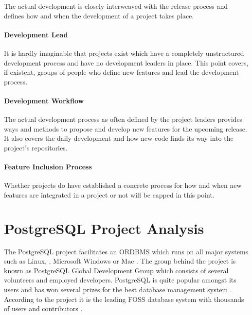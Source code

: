 The actual development is closely interweaved with the release process and
defines how and when the development of a project takes place.

\paragraph{Development Lead}

It is hardly imaginable that projects exist which have a completely
unstructured development process and have no development leaders in place. This
point covers, if existent, groups of people who define new features and lead
the development process.

\paragraph{Development Workflow}

The actual development process as often defined by the project leaders provides
ways and methods to propose and develop new features for the upcoming release.
It also covers the daily development and how new code finds its way into the
project's repositories.

\paragraph{Feature Inclusion Process}

Whether projects do have established a concrete process for how and when new
features are integrated in a project or not will be capped in this point.


\cleardoublepage

\section{PostgreSQL Project Analysis} %


The PostgreSQL project facilitates an \ac{ORDBMS} which runs on all major systems
such as Linux, , Microsoft Windows or Mac 
\cite{PostgreSQLAbout,PostgreSQLFAQ}. The group behind the project is known as
PostgreSQL Global Development Group which consists of several volunteers and
employed developers. PostgreSQL is quite popular amongst its users and has won
several prizes for the best database management system \cite{PostgreSQLAwards}.
According to the project it is the leading \ac{FOSS} database system with
thousands of users and contributors \cite{PostgreSQLPressKit}.

